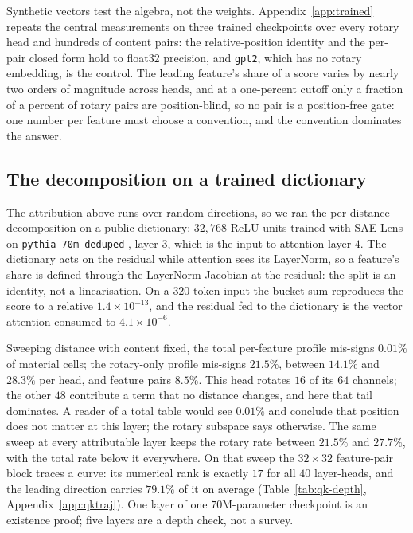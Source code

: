 \documentclass{article}
\theoremstyle{plain}
\theoremstyle{remark}
\begin{document}
Synthetic vectors test the algebra, not the weights. Appendix~\ref{app:trained}
repeats the central measurements on three trained checkpoints over every rotary
head and hundreds of content pairs: the relative-position identity and the
per-pair closed form hold to float32 precision, and \texttt{gpt2}, which has no
rotary embedding, is the control. The leading feature's share of a score varies
by nearly two orders of magnitude across heads, and at a one-percent cutoff only
a fraction of a percent of rotary pairs are position-blind, so no pair is a
position-free gate: one number per feature must choose a convention, and the
convention dominates the answer.

\subsection{The decomposition on a trained dictionary}
\label{sec:features}

The attribution above runs over random directions, so we ran the per-distance
decomposition on a public dictionary: $32{,}768$ ReLU units trained with SAE Lens
\citep{bloom2024saelens} on \texttt{pythia-70m-deduped}
\citep{biderman2023pythia}, layer $3$, which is the input to attention layer
$4$. The
dictionary acts on the residual while attention sees its LayerNorm, so a
feature's share is defined through the LayerNorm Jacobian at the residual: the
split is an identity, not a linearisation. On a $320$-token input the bucket sum
reproduces the score to a relative $1.4\times10^{-13}$, and the residual fed to
the dictionary is the vector attention consumed to $4.1\times10^{-6}$.

Sweeping distance
with content fixed, the total per-feature profile mis-signs $0.01\%$ of material
cells; the rotary-only profile mis-signs $21.5\%$, between $14.1\%$ and $28.3\%$
per head, and feature pairs $8.5\%$. This head rotates $16$ of its $64$ channels;
the other $48$ contribute a term that no distance changes, and here that tail
dominates. A reader of a total table would see $0.01\%$ and conclude that
position does not matter at this layer; the rotary subspace says otherwise. The
same sweep at every attributable layer keeps the rotary rate between $21.5\%$
and $27.7\%$, with the total rate below it everywhere. On that sweep the
$32\times32$ feature-pair block traces a curve: its numerical rank is exactly
$17$ for all $40$ layer-heads, and the leading direction carries $79.1\%$ of it
on average (Table~\ref{tab:qk-depth}, Appendix~\ref{app:qktraj}). One layer of
one $70$M-parameter checkpoint is an existence proof; five layers are a depth
check, not a survey.
\end{document}
